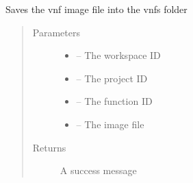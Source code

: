 \documentclass[letterpaper,10pt,english]{sphinxmanual}
\begin{document}

\begin{fulllineitems}
\label{_source/son_editor.impl:son_editor.impl.functionsimpl.save_image_file}
Saves the vnf image file into the vnfs folder
\begin{quote}\begin{description}
\item[{Parameters}] \leavevmode\begin{itemize}
\item {} 
 -- The workspace ID

\item {} 
 -- The project ID

\item {} 
 -- The function ID

\item {} 
 -- The image file

\end{itemize}

\item[{Returns}] \leavevmode
A success message

\end{description}\end{quote}

\end{fulllineitems}

\end{document}

